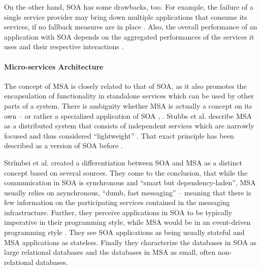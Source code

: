 On the other hand, \ac{SOA} has some drawbacks, too.
For example, the failure of a single service provider may bring down multiple applications that consume its services, if no fallback measures are in place \cite[p.~408f]{Papazoglou2007Service}.
Also, the overall performance of an application with \ac{SOA} depends on the aggregated performances of the services it uses and their respective interactions \cite[p.~408f]{Papazoglou2007Service}.


\paragraph{Micro-services Architecture} %
\label{par:micro_services_architecture}
The concept of \ac{MSA} is closely related to that of \ac{SOA}, as it also promotes the encapsulation of functionality in standalone services which can be used by other parts of a system. There is ambiguity whether \ac{MSA} is actually a concept on its own -- or rather a specialized application of \ac{SOA} \cite[p.~35]{Stubbs2015Distributed}, \cite[p.~17]{Strimbei2015Software}.
Stubbs et al. describe \ac{MSA} as a distributed system that consists of independent services which are   narrowly focused and thus considered ``lightweight'' \cite[p.~35]{Stubbs2015Distributed}.
That exact principle has been described as a version of \ac{SOA} before \cite[p.~395]{Papazoglou2007Service}.

Strîmbei et al. created a differentiation between SOA and MSA as a distinct concept based on several sources. They come to the conclusion, that while the communication in \ac{SOA} is synchronous and ``smart but dependency-laden'', \ac{MSA} usually relies on asynchronous, ``dumb, fast messaging'' -- meaning that there is few information on the participating services contained in the messaging infrastructure. Further, they perceive applications in \ac{SOA} to be typically imperative in their programming style, while \ac{MSA} would be in an event-driven programming style \cite[pp.~17-20]{Strimbei2015Software}. They see \ac{SOA} applications as being usually stateful and \ac{MSA} applications as stateless. Finally they characterize the databases in \ac{SOA} as large relational databases and the databases in \ac{MSA} as small, often non-relational databases.

